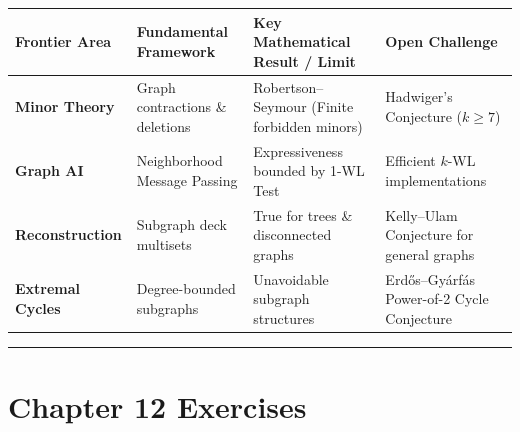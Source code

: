 \documentclass[
]{book}
\newcounter{none} %
\theoremstyle{definition}
\theoremstyle{definition}
\theoremstyle{definition}
\theoremstyle{definition}
\theoremstyle{remark}
\begin{document}
{\def\LTcaptype{none} %
\begin{longtable}[]{@{}
  >{\raggedright\arraybackslash}p{}
  >{\raggedright\arraybackslash}p{}
  >{\raggedright\arraybackslash}p{}
  >{\raggedright\arraybackslash}p{}@{}}
\toprule\noalign{}
\begin{minipage}[b]{\linewidth}\raggedright
Frontier Area
\end{minipage} & \begin{minipage}[b]{\linewidth}\raggedright
Fundamental Framework
\end{minipage} & \begin{minipage}[b]{\linewidth}\raggedright
Key Mathematical Result / Limit
\end{minipage} & \begin{minipage}[b]{\linewidth}\raggedright
Open Challenge
\end{minipage} \\
\midrule\noalign{}
\endhead
\bottomrule\noalign{}
\endlastfoot
\textbf{Minor Theory} & Graph contractions \& deletions & Robertson--Seymour (Finite forbidden minors) & Hadwiger's Conjecture (\(k \ge 7\)) \\
\textbf{Graph AI} & Neighborhood Message Passing & Expressiveness bounded by 1-WL Test & Efficient \(k\)-WL implementations \\
\textbf{Reconstruction} & Subgraph deck multisets & True for trees \& disconnected graphs & Kelly--Ulam Conjecture for general graphs \\
\textbf{Extremal Cycles} & Degree-bounded subgraphs & Unavoidable subgraph structures & Erdős--Gyárfás Power-of-2 Cycle Conjecture \\
\end{longtable}
}

\begin{center}\rule{0.5\linewidth}{0.5pt}\end{center}

\section{Chapter 12 Exercises}\label{chapter-12-exercises}
\end{document}
